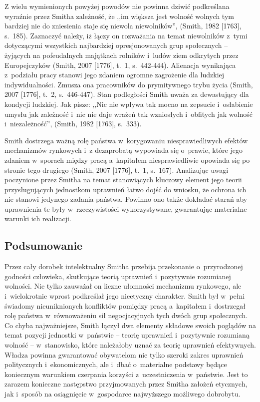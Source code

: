 Z wielu wymienionych powyżej powodów nie powinna dziwić podkreślana wyraźnie przez Smitha zależność, że ,,im większa jest wolność wolnych tym bardziej nie do zniesienia staje się niewola niewolników'', \label{ref:RNDtOthMxkQwu}(Smith, 1982 [1763], s.~185). Zaznaczyć należy, iż łączy on rozważania na temat niewolników z~tymi dotyczącymi wszystkich najbardziej opresjonowanych grup społecznych -- żyjących na pofeudalnych majątkach rolników i~ludów ziem odkrytych przez Europejczyków \label{ref:RND3sDYK8lMK4}(Smith, 2007 [1776], t.~1, s.~442-444). Alienacja wynikająca z~podziału pracy stanowi jego zdaniem ogromne zagrożenie dla ludzkiej indywidualności. Zmusza ona pracowników do prymitywnego trybu życia \label{ref:RNDARpT9oVdt9}(Smith, 2007 [1776], t.~2, s.~446-447). Stan podległości Smith uważa za dewastujący dla kondycji ludzkiej. Jak pisze: ,,Nic nie wpływa tak mocno na zepsucie i~osłabienie umysłu jak zależność i~nic nie daje wrażeń tak wzniosłych i~obfitych jak wolność i~niezależność'', \label{ref:RNDzgsq8IO3HU}(Smith, 1982 [1763], s.~333).

Smith dostrzega ważną rolę państwa w~korygowaniu niesprawiedliwych efektów mechanizmów rynkowych i~z dezaprobatą wypowiada się o~prawie, które jego zdaniem w~sporach między pracą a~kapitałem niesprawiedliwie opowiada się po stronie tego drugiego \label{ref:RNDISiSQpgteG}(Smith, 2007 [1776], t.~1, s.~167). Analizując uwagi poczynione przez Smitha na temat stanowiących kluczowy element jego teorii przysługujących jednostkom uprawnień łatwo dojść do wniosku, że ochrona ich nie stanowi jedynego zadania państwa. Powinno ono także dokładać starań aby uprawnienia te były w~rzeczywistości wykorzystywane, gwarantując materialne warunki ich realizacji.

\subsection{Podsumowanie}

Przez cały dorobek intelektualny Smitha przebija przekonanie o~przyrodzonej godności człowieka, skutkujące teorią uprawnień i~pozytywnie rozumianej wolności. Nie tylko zauważał on liczne ułomności mechanizmu rynkowego, ale i~wielokrotnie wprost podkreślał jego nieetyczny charakter. Smith był w~pełni świadomy nieuniknionych konfliktów pomiędzy pracą a~kapitałem i~dostrzegał rolę państwa w~równoważeniu sił negocjacyjnych tych dwóch grup społecznych. Co chyba najważniejsze, Smith łączył dwa elementy składowe swoich poglądów na temat pozycji jednostki w~państwie -- teorię uprawnień i~pozytywnie rozumianą wolność -- w~stanowisko, które należałoby uznać za teorię uprawnień efektywnych. Władza powinna gwarantować obywatelom nie tylko szeroki zakres uprawnień politycznych i~ekonomicznych, ale i~dbać o~materialne podstawy będące koniecznym warunkiem czerpania korzyści z~uczestniczenia w~państwie. Jest to zarazem konieczne następstwo przyjmowanych przez Smitha założeń etycznych, jak i~sposób na osiągnięcie w~gospodarce najwyższego możliwego dobrobytu.

